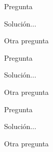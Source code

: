 \documentclass[12pt,a4papper,addpoints]{exam}
\begin{document}
\begin{questions}
  \question[1] Pregunta
    \begin{solutionorbox}[4cm]
        Solución...
    \end{solutionorbox}
    \question[1] Otra pregunta

	\question[1] Pregunta
    \begin{solutionorlines}[4cm]
        Solución...
    \end{solutionorlines}
    \question[1] Otra pregunta    
    
\question[1] Pregunta
    \begin{solutionordottedlines}[4cm]
        Solución...
    \end{solutionordottedlines}
    \question[1] Otra pregunta
    

\end{questions}
%
\end{document}
